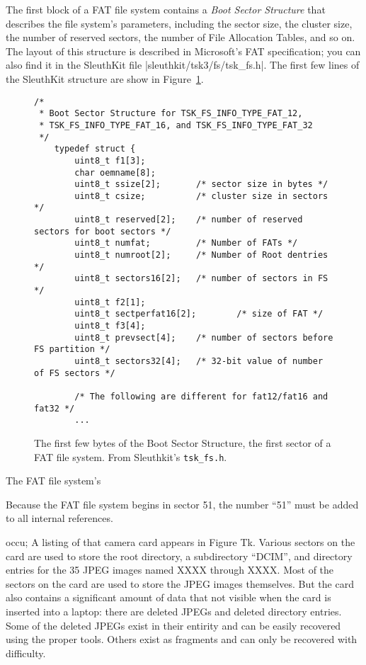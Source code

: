 \documentclass[11pt,letter]{book}
\newcommand{\figref}[1]{Figure~\ref{#1}\xspace}
\begin{document}
The first block of a FAT file system contains a \emph{Boot Sector
  Structure} that describes the file system's parameters, including
the sector size, the cluster size, the number of reserved sectors, the
number of File Allocation Tables, and so on. The layout of this
structure is described in Microsoft's FAT specification; you can also
find it in the SleuthKit file |sleuthkit/tsk3/fs/tsk_fs.h|. The first
few lines of the SleuthKit structure are show in \figref{BSS}.

\begin{figure}
\begin{lstlisting}
/*
 * Boot Sector Structure for TSK_FS_INFO_TYPE_FAT_12,
 * TSK_FS_INFO_TYPE_FAT_16, and TSK_FS_INFO_TYPE_FAT_32
 */
    typedef struct {
        uint8_t f1[3];
        char oemname[8];
        uint8_t ssize[2];       /* sector size in bytes */
        uint8_t csize;          /* cluster size in sectors */
        uint8_t reserved[2];    /* number of reserved sectors for boot sectors */
        uint8_t numfat;         /* Number of FATs */
        uint8_t numroot[2];     /* Number of Root dentries */
        uint8_t sectors16[2];   /* number of sectors in FS */
        uint8_t f2[1];
        uint8_t sectperfat16[2];        /* size of FAT */
        uint8_t f3[4];
        uint8_t prevsect[4];    /* number of sectors before FS partition */
        uint8_t sectors32[4];   /* 32-bit value of number of FS sectors */

        /* The following are different for fat12/fat16 and fat32 */
        ...
\end{lstlisting}
\caption{The first few bytes of the Boot Sector Structure, the first
  sector of a FAT file system. From Sleuthkit's \texttt{tsk\_fs.h}.\label{BSS}}
\end{figure}

The FAT file system's 

Because the FAT file system begins in sector 51, the number ``51''
must be added to all internal references.

occu; A listing of
that camera card appears in Figure Tk. Various sectors on the card are
used to store the root directory, a subdirectory ``DCIM'', and
directory entries for the 35 JPEG
images named XXXX through XXXX. Most of the sectors on the card are
used to store the JPEG images themselves. But the card also contains a
significant amount of data that not visible when the card is
inserted into a laptop: there are deleted JPEGs and deleted directory
entries. Some of the deleted JPEGs exist in their entirity and can be
easily recovered using the proper tools. Others exist as fragments and
can only be recovered with difficulty. 
\end{document}

